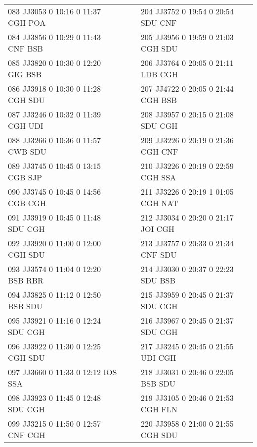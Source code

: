\begin{scriptsize}
\begin{longtable}{l c c l}
083 JJ3053 0 10:16 0 11:37 CGH POA & & & 204 JJ3752 0 19:54 0 20:54 SDU CNF \\

084 JJ3856 0 10:29 0 11:43 CNF BSB & & & 205 JJ3956 0 19:59 0 21:03 CGH SDU \\

085 JJ3820 0 10:30 0 12:20 GIG BSB & & & 206 JJ3764 0 20:05 0 21:11 LDB CGH \\

086 JJ3918 0 10:30 0 11:28 CGH SDU & & & 207 JJ4722 0 20:05 0 21:44 CGH BSB \\

087 JJ3246 0 10:32 0 11:39 CGH UDI & & & 208 JJ3957 0 20:15 0 21:08 SDU CGH \\

088 JJ3266 0 10:36 0 11:57 CWB SDU & & & 209 JJ3226 0 20:19 0 21:36 CGH CNF \\

089 JJ3745 0 10:45 0 13:15 CGB SJP & & & 210 JJ3226 0 20:19 0 22:59 CGH SSA \\

090 JJ3745 0 10:45 0 14:56 CGB CGH & & & 211 JJ3226 0 20:19 1 01:05 CGH NAT \\

091 JJ3919 0 10:45 0 11:48 SDU CGH & & & 212 JJ3034 0 20:20 0 21:17 JOI CGH \\

092 JJ3920 0 11:00 0 12:00 CGH SDU & & & 213 JJ3757 0 20:33 0 21:34 CNF SDU \\

093 JJ3574 0 11:04 0 12:20 BSB RBR & & & 214 JJ3030 0 20:37 0 22:23 SDU BSB \\

094 JJ3825 0 11:12 0 12:50 BSB SDU & & & 215 JJ3959 0 20:45 0 21:37 SDU CGH \\

095 JJ3921 0 11:16 0 12:24 SDU CGH & & & 216 JJ3967 0 20:45 0 21:37 SDU CGH \\

096 JJ3922 0 11:30 0 12:25 CGH SDU & & & 217 JJ3245 0 20:45 0 21:55 UDI CGH \\

097 JJ3660 0 11:33 0 12:12 IOS SSA & & & 218 JJ3031 0 20:46 0 22:05 BSB SDU \\

098 JJ3923 0 11:45 0 12:48 SDU CGH & & & 219 JJ3105 0 20:46 0 21:53 CGH FLN \\

099 JJ3215 0 11:50 0 12:57 CNF CGH & & & 220 JJ3958 0 21:00 0 21:55 CGH SDU \\


\end{longtable}
\end{scriptsize}
